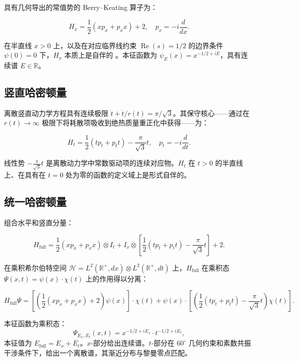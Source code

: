 \documentclass[12pt,a4paper]{article}
\begin{document}
具有几何导出的常值势的 Berry--Keating 算子为：

\begin{equation}
\boxed{H_x = \frac{1}{2}(x p_x + p_x x) + 2}, \quad p_x = -i\frac{d}{dx}.
\end{equation}

在半直线 $x > 0$ 上，以及在对应临界线约束 $\operatorname{Re}(s) = 1/2$ 的边界条件 $\psi(0) = 0$ 下，$H_x$ 本质上是自伴的 \cite{berry-keating}。本征函数为 $\psi_E(x) = x^{-1/2 + iE}$，具有连续谱 $E \in \mathbb{R}$。

\subsection{竖直哈密顿量}

离散竖直动力学方程具有连续极限 $\ddot{t} + \dot{t}/r(t) = \pi/\sqrt{3}$。其保守核心——通过在 $r(t) \to \infty$ 极限下将耗散项吸收到绝热质量重正化中获得——为：

\begin{equation}
\boxed{H_t = \frac{1}{2}(t p_t + p_t t) - \frac{\pi}{\sqrt{3}}t}, \quad p_t = -i\frac{d}{dt}.
\end{equation}

线性势 $-\frac{\pi}{\sqrt{3}}t$ 是离散动力学中常数驱动项的连续对应物。$H_t$ 在 $t > 0$ 的半直线上、在具有在 $t = 0$ 处为零的函数的定义域上是形式自伴的。

\subsection{统一哈密顿量}

组合水平和竖直分量：

\begin{equation}
\boxed{H_{\text{full}} = \frac{1}{2}(x p_x + p_x x) \otimes I_t + I_x \otimes \left[\frac{1}{2}(t p_t + p_t t) - \frac{\pi}{\sqrt{3}}t\right] + 2}.
\end{equation}

在乘积希尔伯特空间 $\mathcal{H} = L^2(\mathbb{R}^+, dx) \otimes L^2(\mathbb{R}^+, dt)$ 上，$H_{\text{full}}$ 在乘积态 $\Psi(x,t) = \psi(x) \cdot \chi(t)$ 上的作用得以分离：

\begin{equation}
H_{\text{full}}\Psi = \left[\left(\frac{1}{2}(x p_x + p_x x) + 2\right)\psi(x)\right] \cdot \chi(t) + \psi(x) \cdot \left[\left(\frac{1}{2}(t p_t + p_t t) - \frac{\pi}{\sqrt{3}}t\right)\chi(t)\right].
\end{equation}

本征函数为乘积态：
\begin{equation}
\Psi_{E_x, E_t}(x, t) = x^{-1/2 + iE_x} \cdot t^{-1/2 + iE_t},
\end{equation}
本征值为 $E_{\text{full}} = E_x + E_t$。$x$-部分给出连续谱。$t$-部分在 $60^\circ$ 几何约束和素数共振干涉条件下，给出一个离散谱，其渐近分布与黎曼零点匹配。
\end{document}
